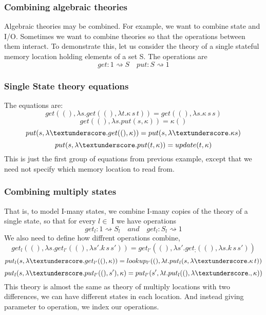 \documentclass{beamer}
\begin{document}
    \begin{frame}
        \frametitle{Combining algebraic theories}
        Algebraic theories may be combined. For example, we want to combine state and I/O.
Sometimes we want to combine theories so that the operations between them interact.
To demonstrate this, let us consider the theory of a single stateful memory location holding
elements of a set S. The operations are
\[
  get : 1 \rightsquigarrow S \quad put : S \rightsquigarrow 1  
\]
    
        
    
    \end{frame}
    \begin{frame}
        \frametitle{Single State theory equations}
        The equations are:
        \[
            get((), \lambda s . get((), \lambda t . \kappa \, s \, t)) = 
            get((), \lambda s . \kappa \, s  \, s)
        \]
        \[
            get((), \lambda s . put(s, \kappa)) = \kappa ()
        \]
        \[
            put(s, \lambda \textunderscore . get((), \kappa)) = put(s, 
            \lambda \textunderscore . \kappa s
            )
        \]
        \[
            put( s, \lambda \textunderscore . put(t, \kappa 
            )) =   update(t, \kappa 
            )
        \]
        This is just the first group of equations from previous example, except that we need not specify
which memory location to read from.

    \end{frame}

    \begin{frame}
        \frametitle{Combining multiply states}
        That is, to model I-many states,
        we combine I-many copies of the theory of a single state, so that for every $l \in$ I we have
        operations
        \[
          get_l : 1 \rightsquigarrow S_l \quad and \quad   get_l : S_l \rightsquigarrow 1
        \]
        We also need to define how diffrent operations combine,
        \[
            get_l((), \lambda s. get_{l'} ((),  \lambda s'. k \, s\, s'))
            = get_{l'}((), \lambda s'. get_; ((),  \lambda s. k \, s\, s'))
        \]
        \[
          put_l(s, \lambda \textunderscore. get_{l'}((), \kappa))  
          = lookup_{l'}((), \lambda t. put_l(s, \lambda \textunderscore. \kappa \, t))
        \]
        \[
            put_l(s, \lambda \textunderscore. put_{l'}((), s'), 
            \kappa)
            =   put_{l'}(s', \lambda t. put_{l}((), \lambda \textunderscore., 
            \kappa))
        \]
        This theory is almost the same as theory of multiply locations with two differences, 
        we can have different states in each location. And instead giving parameter to operation, we index our operations.
    
    \end{frame}
\end{document}
